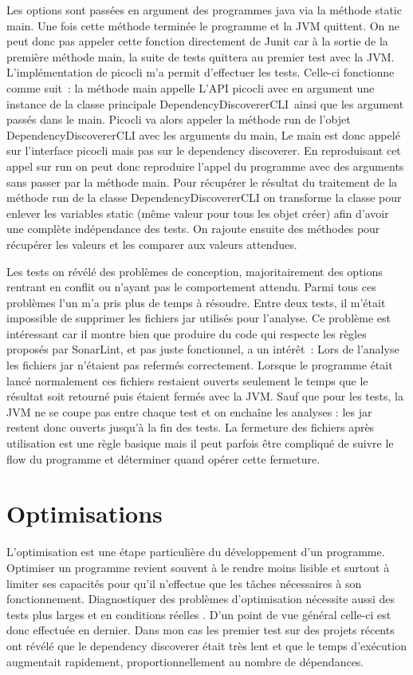 \documentclass[french,a4paper,12pt]{report}
\begin{document}
Les options sont passées en argument des programmes java via la méthode static main. Une fois cette méthode terminée le programme et la JVM quittent. On ne peut donc pas appeler cette fonction directement de Junit car à la sortie de la première méthode main, la suite de tests quittera au premier test avec la JVM. 
L’implémentation de picocli m’a permit d’effectuer les tests. Celle-ci fonctionne comme suit : la méthode main appelle L’API picocli avec en argument une instance de la classe principale DependencyDiscovererCLI ainsi que les argument passés dans le main.
Picocli va alors appeler la méthode run de l'objet DependencyDiscovererCLI avec les arguments du main, Le main est donc appelé sur l'interface picocli mais pas sur le dependency discoverer.
En reproduisant cet appel sur run on peut donc reproduire l’appel du programme avec des arguments sans passer par la méthode main.
Pour récupérer le résultat du traitement de la méthode run de la classe DependencyDiscovererCLI on transforme la classe pour enlever les variables static (même valeur pour tous les objet créer) afin d’avoir une complète indépendance des tests. On rajoute ensuite des méthodes pour récupérer les valeurs et les comparer aux valeurs attendues.

Les tests on révélé des problèmes de conception, majoritairement des options rentrant en conflit ou n’ayant pas le comportement attendu. Parmi tous ces problèmes l'un m’a pris plus de temps à résoudre. Entre deux tests, il m’était impossible de supprimer les fichiers jar utilisés pour l’analyse. Ce problème est intéressant car il montre bien que produire du code qui respecte les règles proposés par SonarLint,  et pas juste fonctionnel, a un intérêt : 
Lors de l'analyse les fichiers jar n'étaient pas refermés correctement. Lorsque le programme était lancé normalement ces fichiers restaient ouverts seulement le temps que le résultat soit retourné puis étaient fermés avec la JVM. Sauf que pour les tests, la JVM ne se coupe pas entre chaque test et on enchaîne les analyses : les jar restent donc ouverts jusqu’à la fin des tests. 
La fermeture des fichiers après utilisation est une règle basique mais il peut parfois être compliqué de suivre le flow du programme et déterminer quand opérer cette fermeture.

\section{Optimisations}
L’optimisation est une étape particulière du développement d’un programme. Optimiser un programme revient souvent à le rendre moins lisible et surtout à limiter ses capacités pour qu’il n’effectue que les tâches nécessaires à son fonctionnement. Diagnostiquer des problèmes d’optimisation nécessite aussi des tests plus larges et en conditions réelles . D’un point de vue général celle-ci est donc effectuée en dernier. 
Dans mon cas les premier test sur des projets récents ont révélé que le dependency discoverer était très lent et que le temps d’exécution augmentait rapidement, proportionnellement au nombre de dépendances. 
\end{document}
